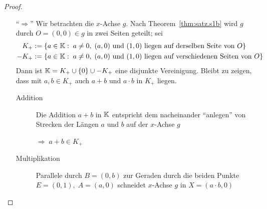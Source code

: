 \begin{proof}
    \begin{itemize}
        \item["`$\Longrightarrow$"'] Wir betrachten die $x$-Achse $g$. Nach
            Theorem~\ref{thm:satz.s1b} wird $g$ durch $O = (0,0) \in g$ in zwei Seiten geteilt; sei
            \begin{align*}
                K_+ & := \{a \in \mathbb K:\; a \neq 0,\; (a,0) \mbox{ und } (1,0) \mbox{ liegen auf
                derselben Seite von } O\}\\
                -K_+ & := \{a \in \mathbb K:\; a \neq 0,\; (a,0) \mbox{ und } (1,0) \mbox{ liegen auf
                verschiedenen Seiten von } O\}
            \end{align*}
            Dann ist $\mathbb K = K_+ \cup \{0\} \cup -K_+$ eine disjunkte Vereinigung. Bleibt zu zeigen,
            dass mit $a, b\in K_+$ auch $a + b$ und $a \cdot b$ in $K_+$ liegen.
            \begin{description}
                \item[Addition] Die Addition $a + b$ in $\mathbb K$ entspricht dem nacheinander "`anlegen"'
                    von Strecken der Längen $a$ und $b$ auf der $x$-Achse $g$


                    $\Rightarrow\; a + b \in K_+$

                    \begin{figure}[ht]
                        
                    \end{figure}

                \item[Multiplikation] Parallele durch $B = (0,b)$ zur Geraden durch die beiden
                    Punkte $E = (0,1),\; A = (a,0)$ schneidet $x$-Achse $g$ in $X = (a \cdot b, 0)$


                    \begin{figure}[ht]
                        
                    \end{figure}


\end{description}
\end{itemize}
\end{proof}
